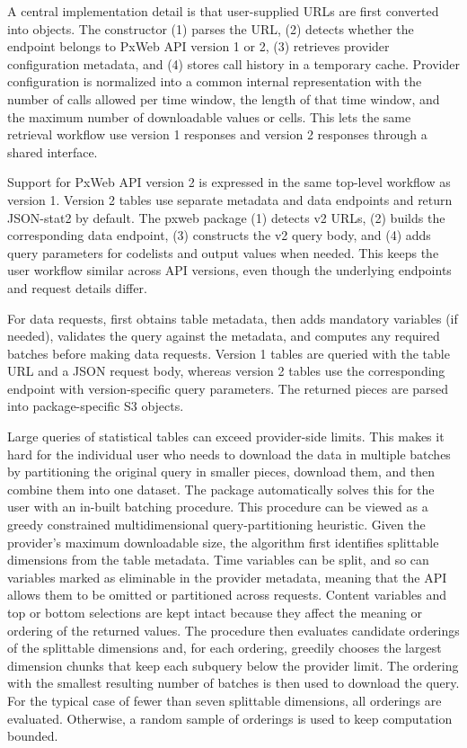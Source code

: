 \documentclass[11pt]{article}
\DeclareRobustCommand{\pkg}[1]{\textsf{#1}}
\DeclareRobustCommand{\code}[1]{\texttt{\detokenize{#1}}}
\begin{document}
A central implementation detail is that user-supplied URLs are first converted into \code{pxweb} objects.
The constructor (1) parses the URL, (2) detects whether the endpoint belongs to PxWeb API version 1 or 2, (3) retrieves provider configuration metadata, and (4) stores call history in a temporary cache.
Provider configuration is normalized into a common internal representation with the number of calls allowed per time window, the length of that time window, and the maximum number of downloadable values or cells.
This lets the same retrieval workflow use version 1 \code{?config} responses and version 2 \code{/config} responses through a shared interface.

Support for PxWeb API version 2 is expressed in the same top-level workflow as version 1.
Version 2 tables use separate metadata and data endpoints and return JSON-stat2 by default\citep{PxToolsPxWeb2Intro}.
The \pkg{pxweb} package (1) detects v2 URLs, (2) builds the corresponding data endpoint, (3) constructs the v2 query body, and (4) adds query parameters for codelists and output values when needed.
This keeps the user workflow similar across API versions, even though the underlying endpoints and request details differ.

For data requests, \code{pxweb_get()} first obtains table metadata, then adds mandatory variables (if needed), validates the query against the metadata, and computes any required batches before making data requests.
Version 1 tables are queried with the table URL and a JSON request body, whereas version 2 tables use the corresponding \code{/tables/\{id\}/data} endpoint with version-specific query parameters.
The returned pieces are parsed into package-specific S3 objects.

Large queries of statistical tables can exceed provider-side limits.
This makes it hard for the individual user who needs to download the data in multiple batches by partitioning the original query in smaller pieces, download them, and then combine them into one dataset.
The \code{pxweb} package automatically solves this for the user with an in-built batching procedure.
This procedure can be viewed as a greedy constrained multidimensional query-partitioning heuristic.
Given the provider's maximum downloadable size, the algorithm first identifies splittable dimensions from the table metadata.
Time variables can be split, and so can variables marked as eliminable in the provider metadata, meaning that the API allows them to be omitted or partitioned across requests.
Content variables and top or bottom selections are kept intact because they affect the meaning or ordering of the returned values.
The procedure then evaluates candidate orderings of the splittable dimensions and, for each ordering, greedily chooses the largest dimension chunks that keep each subquery below the provider limit.
The ordering with the smallest resulting number of batches is then used to download the query.
For the typical case of fewer than seven splittable dimensions, all orderings are evaluated.
Otherwise, a random sample of orderings is used to keep computation bounded.
\end{document}
